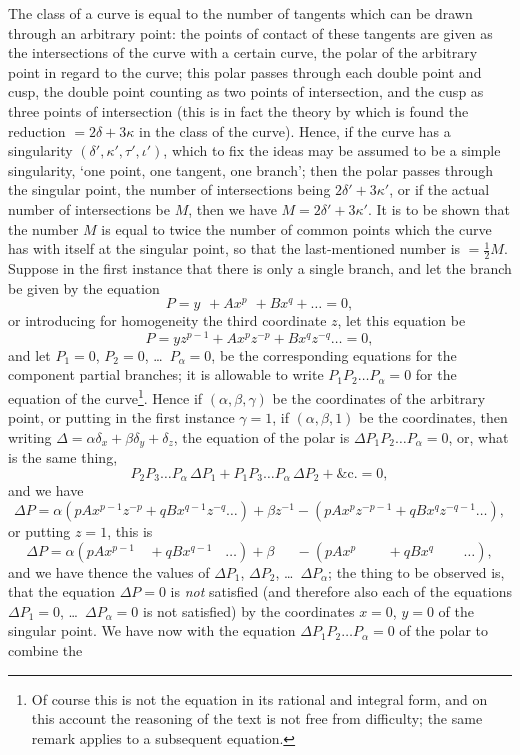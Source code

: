\documentclass[11pt,a4paper]{article}
\begin{document}
The class of a curve is equal to the number of tangents which can be drawn through an arbitrary point: the points of contact of these tangents are given as the intersections of the curve with a certain curve, the polar of the arbitrary point in regard to the curve; this polar passes through each double point and cusp, the double point counting as two points of intersection, and the cusp as three points of intersection (this is in fact the theory by which is found the reduction $= 2\delta + 3\kappa$ in the class of the curve). Hence, if the curve has a singularity $(\delta', \kappa', \tau', \iota')$, which to fix the ideas may be assumed to be a simple singularity, `one point, one tangent, one branch'; then the polar passes through the singular point, the number of intersections being $2\delta' + 3\kappa'$, or if the actual number of intersections be $M$, then we have $M = 2\delta' + 3\kappa'$. It is to be shown that the number $M$ is equal to twice the number of common points which the curve has with itself at the singular point, so that the last-mentioned number is $= \tfrac{1}{2}M$. Suppose in the first instance that there is only a single branch, and let the branch be given by the equation
\[
P = y\phantom{^{p}} + Ax^{p}\phantom{^{q}} + Bx^{q} + \ldots = 0,
\]
or introducing for homogeneity the third coordinate $z$, let this equation be
\[
P = yz^{p-1} + Ax^{p}z^{-p} + Bx^{q}z^{-q}\ldots = 0,
\]
and let $P_{1} = 0$, $P_{2} = 0$, \ldots\ $P_{\alpha} = 0$, be the corresponding equations for the component partial branches; it is allowable to write $P_{1}P_{2}\ldots P_{\alpha} = 0$ for the equation of the curve\footnote{Of course this is not the equation in its rational and integral form, and on this account the reasoning of the text is not free from difficulty; the same remark applies to a subsequent equation.}. Hence if $(\alpha, \beta, \gamma)$ be the coordinates of the arbitrary point, or putting in the first instance $\gamma = 1$, if $(\alpha, \beta, 1)$ be the coordinates, then writing $\Delta = \alpha\delta_{x} + \beta\delta_{y} + \delta_{z}$, the equation of the polar is $\Delta P_{1}P_{2}\ldots P_{\alpha} = 0$, or, what is the same thing,
\[
P_{2}P_{3}\ldots P_{\alpha}\,\Delta P_{1} + P_{1}P_{3}\ldots P_{\alpha}\,\Delta P_{2} + \&\text{c.} = 0,
\]
and we have
\[
\Delta P = \alpha(pAx^{p-1}z^{-p} + qBx^{q-1}z^{-q}\ldots) + \beta z^{-1} - (pAx^{p}z^{-p-1} + qBx^{q}z^{-q-1}\ldots),
\]
or putting $z = 1$, this is
\[
\Delta P = \alpha(pAx^{p-1}\phantom{^{-p}} + qBx^{q-1}\phantom{^{-q}} \ldots) + \beta\phantom{x^{-1}} - (pAx^{p}\phantom{^{-p-1}} + qBx^{q}\phantom{^{-q-1}} \ldots),
\]
and we have thence the values of $\Delta P_{1}$, $\Delta P_{2}$, \ldots\ $\Delta P_{\alpha}$; the thing to be observed is, that the equation $\Delta P = 0$ is \textit{not} satisfied (and therefore also each of the equations $\Delta P_{1} = 0$, \ldots\ $\Delta P_{\alpha} = 0$ is not satisfied) by the coordinates $x = 0$, $y = 0$ of the singular point. We have now with the equation $\Delta P_{1}P_{2}\ldots P_{\alpha} = 0$ of the polar to combine the
\end{document}
